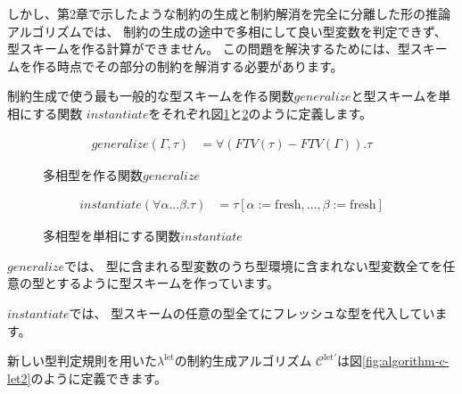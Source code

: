 しかし、第2章で示したような制約の生成と制約解消を完全に分離した形の推論アルゴリズムでは、
制約の生成の途中で多相にして良い型変数を判定できず、型スキームを作る計算ができません。
この問題を解決するためには、型スキームを作る時点でその部分の制約を解消する必要があります。

制約生成で使う最も一般的な型スキームを作る関数$\mathit{generalize}$と型スキームを単相にする関数
$\mathit{instantiate}$をそれぞれ図\ref{fig:generalize}と\ref{fig:instantiate}のように定義します。

\begin{figure}[htbp]
  \begin{align*}
    \mathit{generalize}(\Gamma, \tau) &= \forall (FTV(\tau) - FTV(\Gamma)) . \tau
  \end{align*}
  \caption{多相型を作る関数$\mathit{generalize}$}
  \label{fig:generalize}
\end{figure}

\begin{figure}[htbp]
  \begin{align*}
    \mathit{instantiate}(\forall \alpha ... \beta . \tau) &=
      \tau [\alpha := \mathrm{fresh}, \dots, \beta := \mathrm{fresh}]
  \end{align*}
  \caption{多相型を単相にする関数$\mathit{instantiate}$}
  \label{fig:instantiate}
\end{figure}

$\mathit{generalize}$では、
型に含まれる型変数のうち型環境に含まれない型変数全てを任意の型とするように型スキームを作っています。

$\mathit{instantiate}$では、
型スキームの任意の型全てにフレッシュな型を代入しています。

新しい型判定規則を用いた$\lambda^\mathrm{let}$の制約生成アルゴリズム
$\mathcal C^\mathrm{let'}$は図\ref{fig:algorithm-c-let2}のように定義できます。

